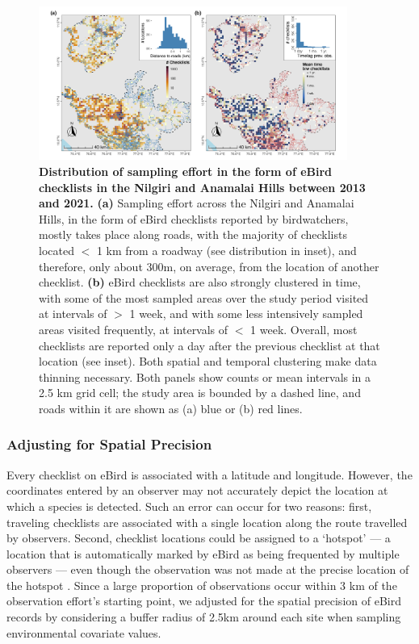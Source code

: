 \begin{figure}[t!]
    \centering
    \includegraphics[width=0.9\textwidth]{figures/hillybirds/fig_03.png}
    \caption{
        \textbf{Distribution of sampling effort in the form of eBird checklists in the Nilgiri and Anamalai Hills between 2013 and 2021.}
        \textbf{(a)} Sampling effort across the Nilgiri and Anamalai Hills, in the form of eBird checklists reported by birdwatchers, mostly takes place along roads, with the majority of checklists located $<$ 1 km from a roadway (see distribution in inset), and therefore, only about 300m, on average, from the location of another checklist.
        \textbf{(b)} eBird checklists are also strongly clustered in time, with some of the most sampled areas over the study period visited at intervals of $>$ 1 week, and with some less intensively sampled areas visited frequently, at intervals of $<$ 1 week.
        Overall, most checklists are reported only a day after the previous checklist at that location (see inset).
        Both spatial and temporal clustering make data thinning necessary.
        Both panels show counts or mean intervals in a 2.5 km grid cell; the study area is bounded by a dashed line, and roads within it are shown as (a) blue or (b) red lines.
    }
\end{figure}

\subsubsection*{Adjusting for Spatial Precision}

Every checklist on eBird is associated with a latitude and longitude.
However, the coordinates entered by an observer may not accurately depict the location at which a species is detected.
Such an error can occur for two reasons: first, traveling checklists are associated with a single location along the route travelled by observers.
Second, checklist locations could be assigned to a `hotspot' --- a location that is automatically marked by eBird as being frequented by multiple observers --- even though the observation was not made at the precise location of the hotspot \citep{praveenj.2017}.
Since a large proportion of observations occur within 3 km of the observation effort's starting point, we adjusted for the spatial precision of eBird records by considering a buffer radius of 2.5km around each site when sampling environmental covariate values.


